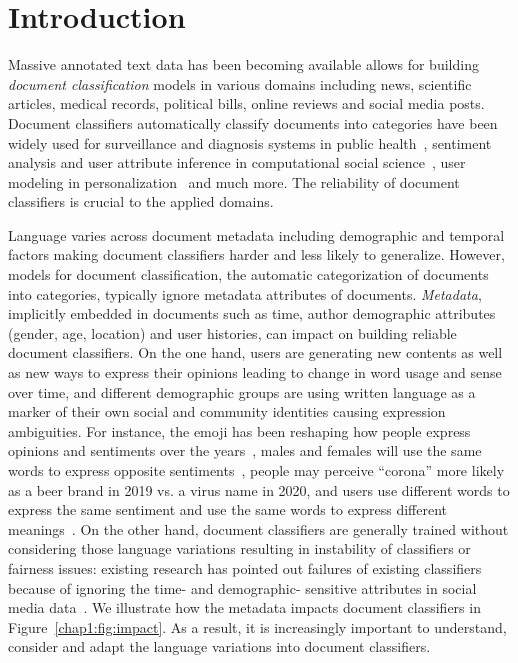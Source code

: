 \chapter{Introduction}
\label{chp:intro}

Massive annotated text data has been becoming available allows for building \textit{document classification} models in various domains including news, scientific articles, medical records, political bills, online reviews and social media posts.
Document classifiers automatically classify documents into categories have been widely used for surveillance and diagnosis systems in public health~\cite{lamb2013separating, de2016discovering, huang2019can, zhu2019detecting}, sentiment analysis and user attribute inference in computational social science~\cite{rosenthal2011age, yang2016hierarchical, huang2017exploring, heindorf2019debiasing}, user modeling in personalization~\cite{tang2015learning, wu2016personalized, huang2019neuraluser, pan2019social} and much more. 
The reliability of document classifiers is crucial to the applied domains.


Language varies across document metadata including demographic and temporal factors making document classifiers harder and less likely to generalize. 
However, models for document classification, the automatic categorization of documents into categories, typically ignore metadata attributes of documents. 
\textit{Metadata}, implicitly embedded in documents such as time, author demographic attributes (gender, age, location) and user histories, can impact on building reliable document classifiers.
On the one hand, users are generating new contents as well as new ways to express their opinions leading to change in word usage and sense over time, and different demographic groups are using written language as a marker of their own social and community identities causing expression ambiguities.
For instance, the emoji has been reshaping how people express opinions and sentiments over the years~\cite{felbo2017using}, males and females will use the same words to express opposite sentiments~\cite{volkova2013exploring}, people may perceive ``corona'' more likely as a beer brand in 2019 vs. a virus name in 2020, and users use different words to express the same sentiment and use the same words to express different meanings~\cite{oba2019modeling}. %
On the other hand, document classifiers are generally trained without considering those language variations resulting in instability of classifiers or fairness issues: existing research has pointed out failures of existing classifiers because of ignoring the time- and demographic- sensitive attributes in social media data~\cite{gayo2011limits, gayo2013predicting}.
We illustrate how the metadata impacts document classifiers in Figure~\ref{chap1:fig:impact}.
As a result, it is increasingly important to understand, consider and adapt the language variations into document classifiers.


